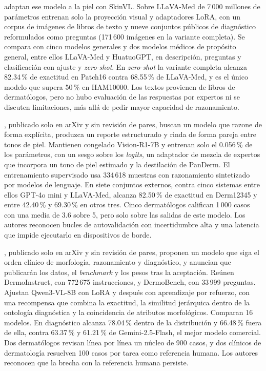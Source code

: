 \textcite{zeng2025mmskin} adaptan ese modelo a la piel con SkinVL. Sobre LLaVA-Med de 7\,000 millones de parámetros
entrenan solo la proyección visual y adaptadores LoRA, con un corpus de imágenes de libros de texto y nueve conjuntos
públicos de diagnóstico reformulados como preguntas (171\,600 imágenes en la variante completa). Se compara con cinco
modelos generales y dos modelos médicos de propósito general, entre ellos LLaVA-Med y HuatuoGPT, en descripción, preguntas y
clasificación con ajuste y \emph{zero-shot}. En \emph{zero-shot} la variante completa alcanza 82.34\,\% de exactitud en
Patch16 contra 68.55\,\% de LLaVA-Med, y es el único modelo que supera 50\,\% en HAM10000. Los textos provienen de
libros de dermatólogos, pero no hubo evaluación de las respuestas por expertos ni se discuten limitaciones, más allá de
pedir mayor capacidad de razonamiento.

\textcite{shen2025skingptr1}, publicado solo en arXiv y sin revisión de pares, buscan un modelo que razone de forma
explícita, produzca un reporte estructurado y rinda de forma pareja entre tonos de piel. Mantienen congelado
Vision-R1-7B y entrenan solo el 0.056\,\% de los parámetros, con un sesgo sobre los \emph{logits}, un adaptador de
mezcla de expertos que incorpora un tono de piel estimado y la destilación de PanDerm. El entrenamiento supervisado usa
334\,618 muestras con razonamiento sintetizado por modelos de lenguaje. En siete conjuntos externos, contra cinco
sistemas entre ellos GPT-4o mini y LLaVA-Med, alcanza 82.50\,\% de exactitud en Derm12345 y entre 42.40\,\% y
69.30\,\% en otros tres. Cinco dermatólogos califican 1\,000 casos con una media de 3.6 sobre 5, pero solo sobre las
salidas de este modelo. Los autores reconocen bucles de autovalidación con incertidumbre alta y una latencia que impide
ejecutarlo en dispositivos de borde.

\textcite{ru2026dermogpt}, publicado solo en arXiv y sin revisión de pares, proponen un modelo que siga el orden
clínico de morfología, razonamiento y diagnóstico, y anuncian que publicarán los datos, el \emph{benchmark} y los
pesos tras la aceptación. Reúnen DermoInstruct,
con 772\,675 instrucciones, y DermoBench, con 33\,999 preguntas. Ajustan Qwen3-VL-8B con LoRA y después con aprendizaje
por refuerzo, con una recompensa que combina la exactitud, la similitud jerárquica dentro de la ontología diagnóstica y
la coincidencia de atributos morfológicos. Comparan 16 modelos. En diagnóstico alcanza 78.04\,\% dentro de la
distribución y 66.48\,\% fuera de ella, contra 63.37\,\% y 61.21\,\% de Gemini-2.5-Flash, el mejor modelo comercial.
Dos dermatólogos revisan línea por línea un núcleo de 900 casos, y dos clínicos de dermatología resuelven 100 casos
por tarea como referencia humana. Los autores reconocen que la
brecha con la referencia humana persiste.

